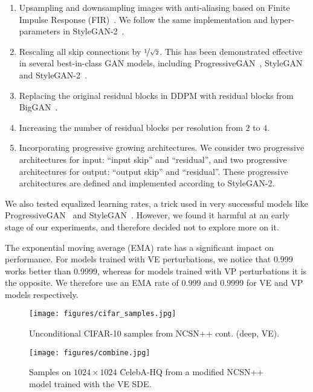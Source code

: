 \documentclass{article} \usepackage{iclr2021_conference,times}
\begin{document}
\begin{enumerate}
    \item Upsampling and downsampling images with anti-aliasing based on Finite Impulse Response (FIR)~\citep{zhang2019shiftinvar}. We follow the same implementation and hyper-parameters in StyleGAN-2~\citep{Karras2019stylegan2}.
    \item Rescaling all skip connections by $\nicefrac{1}{\sqrt{2}}$. This has been demonstrated effective in several best-in-class GAN models, including ProgressiveGAN~\citep{karras2018progressive}, StyleGAN~\citep{karras2019style} and StyleGAN-2~\citep{Karras2019stylegan2}.
    \item Replacing the original residual blocks in DDPM with residual blocks from BigGAN~\citep{brock2018large}.
    \item Increasing the number of residual blocks per resolution from $2$ to $4$.
    \item Incorporating progressive growing architectures. We consider two progressive architectures for input: ``input skip'' and ``residual'', and two progressive architectures for output: ``output skip'' and ``residual''. These progressive architectures are defined and implemented according to StyleGAN-2.
\end{enumerate}

We also tested equalized learning rates, a trick used in very successful models like ProgressiveGAN~\citep{karras2018progressive} and StyleGAN~\citep{karras2019style}. However, we found it harmful at an early stage of our experiments, and therefore decided not to explore more on it.

The exponential moving average (EMA) rate has a significant impact on performance. For models trained with VE perturbations, we notice that 0.999 works better than 0.9999, whereas for models trained with VP perturbations it is the opposite. We therefore use an EMA rate of 0.999 and 0.9999 for VE and VP models respectively.


\begin{figure}
    \centering
    \texttt{[image: figures/cifar\_samples.jpg]}
    \caption{Unconditional CIFAR-10 samples from NCSN++ cont. (deep, VE).}
    \label{fig:cifar_samples}
\end{figure}

\begin{figure}
    \centering
    \texttt{[image: figures/combine.jpg]}
    \caption{Samples on $1024\times 1024$ CelebA-HQ from a modified NCSN++ model trained with the VE SDE.}
    \label{fig:celebahq}
\end{figure}
\end{document}
